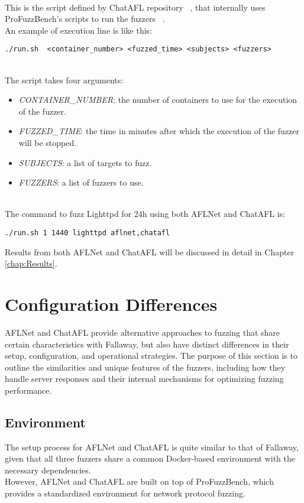 \phantom{}\\
This is the script defined by ChatAFL repository ~\cite{chataflgithub}, that internally uses ProFuzzBench's scripts to run the fuzzers ~\cite{chataflgithubprofuz}.
\\An example of execution line is like this:\\
\begin{lstlisting}
./run.sh  <container_number> <fuzzed_time> <subjects> <fuzzers>
\end{lstlisting}
\phantom{}\\
The script takes four arguments:\\
\begin{itemize}
    \item \textit{CONTAINER\_NUMBER}: the number of containers to use for the execution of the fuzzer.
    \item \textit{FUZZED\_TIME}: the time in minutes after which the execution of the fuzzer will be stopped.
    \item \textit{SUBJECTS}: a list of targets to fuzz.
    \item \textit{FUZZERS}: a list of fuzzers to use.
\end{itemize}
\phantom{}\\
The command to fuzz Lighttpd for 24h using both AFLNet and ChatAFL is:
\begin{lstlisting}
./run.sh 1 1440 lighttpd aflnet,chatafl
\end{lstlisting}
Results from both AFLNet and ChatAFL will be discussed in detail in Chapter \ref{chap:Results}.

\section{Configuration Differences}

AFLNet and ChatAFL provide alternative approaches to fuzzing that share certain characteristics with Fallaway, but also have distinct differences in their setup, configuration, and operational strategies. The purpose of this section is to outline the similarities and unique features of the fuzzers, including how they handle server responses and their internal mechanisms for optimizing fuzzing performance.

\subsection{Environment}
The setup process for AFLNet and ChatAFL is quite similar to that of Fallaway, given that all three fuzzers share a common Docker-based environment with the necessary dependencies.
\\However, AFLNet and ChatAFL are built on top of ProFuzzBench, which provides a standardized environment for network protocol fuzzing.

